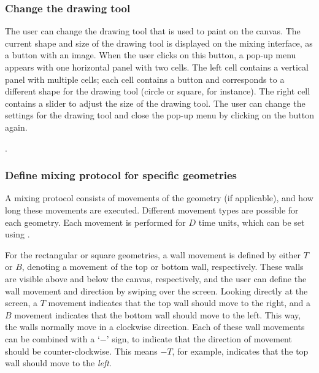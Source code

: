 \subsubsection{Change the drawing tool}
The user can change the drawing tool that is used to paint on the canvas. The current shape and size of the drawing tool is displayed on the mixing interface, as a button with an image. When the user clicks on this button, a pop-up menu appears with one horizontal panel with two cells. The left cell contains a vertical panel with multiple cells; each cell contains a button and corresponds to a different shape for the drawing tool (circle or square, for instance). The right cell contains a slider to adjust the size of the drawing tool. The user can change the settings for the drawing tool and close the pop-up menu by clicking on the button again.

. %

\subsubsection{Define mixing protocol for specific geometries}
A mixing protocol consists of movements of the geometry (if applicable), and how long these movements are executed. Different movement types are possible for each geometry. Each movement is performed for $D$ time units, which can be set using .

For the rectangular or square geometries, a wall movement is defined by either $T$ or $B$, denoting a movement of the top or bottom wall, respectively. These walls are visible above and below the canvas, respectively, and the user can define the wall movement and direction by swiping over the screen. Looking directly at the screen, a $T$ movement indicates that the top wall should move to the right, and a $B$ movement indicates that the bottom wall should move to the left. This way, the walls normally move in a clockwise direction. Each of these wall movements can be combined with a `$-$' sign, to indicate that the direction of movement should be counter-clockwise. This means $-T$, for example, indicates that the top wall should move to the \emph{left}. 


